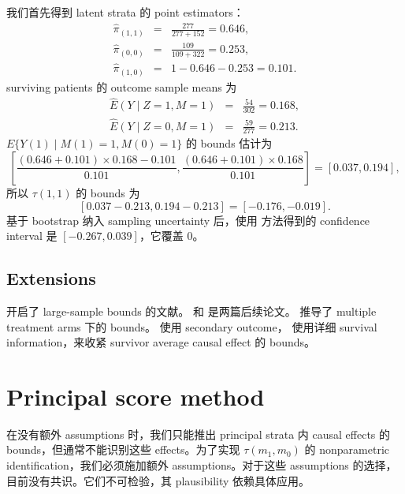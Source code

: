
我们首先得到 latent strata 的 point estimators：
\begin{eqnarray*} 
 \hat{\pi}_{(1,1)} &=& \frac{277}{277+152} = 0.646, \\
  \hat{\pi}_{(0,0)} &=&  \frac{109}{109+322} = 0.253,  \\ 
\hat{\pi}_{(1,0)} &=& 1 -0.646 -  0.253 =   0.101. 
\end{eqnarray*} 
surviving patients 的 outcome sample means 为
\begin{eqnarray*} 
\hat{E}(Y\mid Z=1,M=1) &=& \frac{54}{302} = 0.168, \\ 
\hat{E}(Y\mid Z=0, M=1) &=& \frac{59}{277} = 0.213.
\end{eqnarray*} 
$E\{Y(1)\mid M(1)=1,M(0)=1\}$ 的 bounds 估计为
$$
\left[ \frac{  ( 0.646 + 0.101 )\times  0.168-  0.101 }{  0.101 },  
\frac{ ( 0.646 + 0.101 )\times  0.168}{0.101} \right]
= [  0.037, 0.194],
$$
所以 $\tau(1,1)$ 的 bounds 为
$$
[0.037- 0.213, 0.194- 0.213] = 
[  -0.176, -0.019 ] . 
$$
基于 bootstrap 纳入 sampling uncertainty 后，使用 \citet{imbens2004confidence} 方法得到的 confidence interval 是 $[-0.267,0.039]$，它覆盖 0。




\subsection{Extensions}


\citet{zhang2003estimation} 开启了 large-sample bounds 的文献。\citet{imai2008sharp} 和 \citet{lee2009training} 是两篇后续论文。\citet{cheng2006bounds} 推导了 multiple treatment arms 下的 bounds。\citet{yang2016using} 使用 secondary outcome，\citet{yang2018using} 使用详细 survival information，来收紧 survivor average causal effect 的 bounds。

 
 
 
\section{Principal score method} 
 
 
 
 
在没有额外 assumptions 时，我们只能推出 principal strata 内 causal effects 的 bounds，但通常不能识别这些 effects。为了实现 $\tau(m_1,m_0)$ 的 nonparametric identification，我们必须施加额外 assumptions。对于这些 assumptions 的选择，目前没有共识。它们不可检验，其 plausibility 依赖具体应用。

